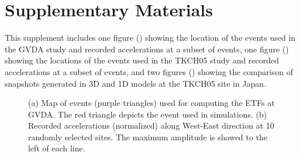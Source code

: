 \section*{Supplementary Materials}

This supplement includes one figure () showing the location of the events used in the GVDA study and recorded accelerations at a subset of events, one figure () showing the locations of the events used in the TKCH05 study and recorded accelerations at a subset of events, and two figures () showing the comparison of snapshots generated in 3D and 1D models at the TKCH05 site in Japan.

\clearpage
{}
\begin{figure}[!ht]
   \hfil
  \caption{(a) Map of events (purple triangles) used for computing the ETFs at GVDA. The red triangle depicts the event used in simulations. (b) Recorded accelerations (normalized) along West-East direction at 10 randomly selected sites. The maximum amplitude is showed to the left of each line.}
  \label{fig:etf-S1}
\end{figure}


